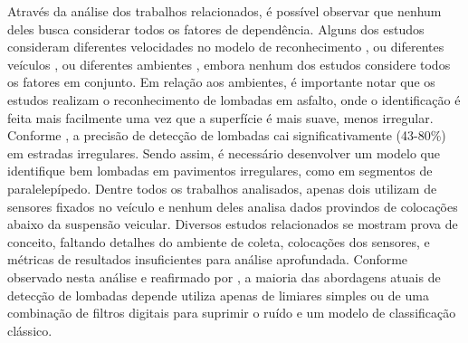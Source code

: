 Através da análise dos trabalhos relacionados, é possível observar que nenhum deles busca considerar todos os fatores de dependência. Alguns dos estudos consideram diferentes velocidades no modelo de reconhecimento  \cite{Rishiwal2016,Aljaafreh2017,Sabir2019}, ou diferentes veículos \cite{Savera2016,Idris2019,Alam2020}, ou diferentes ambientes \cite{Padilla2018}, embora nenhum dos estudos considere todos os fatores em conjunto. Em relação aos ambientes, é importante notar que os estudos realizam o reconhecimento de lombadas em asfalto, onde o identificação é feita mais facilmente uma vez que a superfície é mais suave, menos irregular. Conforme \cite{Alam2020}, a precisão de detecção de lombadas cai significativamente (43-80\%) em estradas irregulares. Sendo assim, é necessário desenvolver um modelo que identifique bem lombadas em pavimentos irregulares, como em segmentos de paralelepípedo. Dentre todos os trabalhos analisados, apenas dois utilizam de sensores fixados no veículo e nenhum deles analisa dados provindos de colocações abaixo da suspensão veicular. Diversos estudos relacionados se mostram prova de conceito, faltando detalhes do ambiente de coleta, colocações dos sensores, e métricas de resultados insuficientes para análise aprofundada. Conforme observado nesta análise e reafirmado por \cite{Padilla2018}, a maioria das abordagens atuais de detecção de lombadas depende utiliza apenas de limiares simples ou de uma combinação de filtros digitais para suprimir o ruído e um modelo de classificação clássico.
